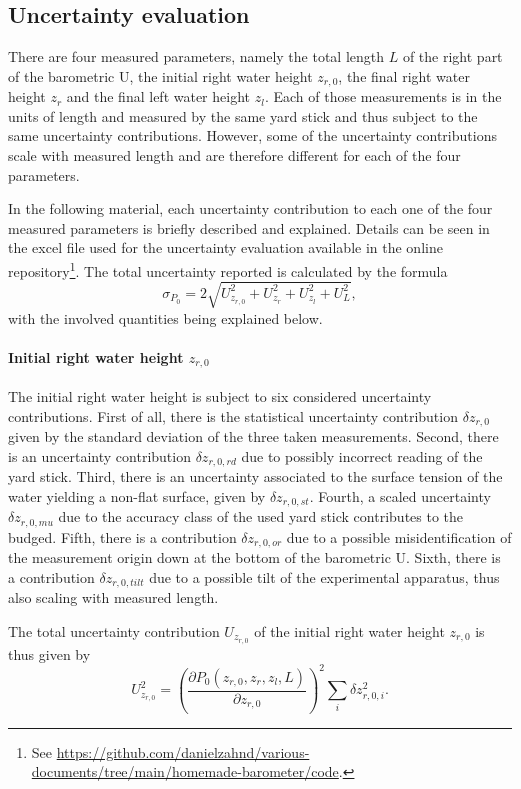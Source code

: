 \documentclass[a4paper,11pt, twocolumn]{article}
\begin{document}
\subsection{Uncertainty evaluation}
There are four measured parameters, namely the total length $L$ of the right part of the barometric U, the initial right water height $z_{r,0}$, the final right water height $z_r$ and the final left water height $z_l$. Each of those measurements is in the units of length and measured by the same yard stick and thus subject to the same uncertainty contributions. However, some of the uncertainty contributions scale with measured length and are therefore different for each of the four parameters.

In the following material, each uncertainty contribution to each one of the four measured parameters is briefly described and explained. Details can be seen in the excel file used for the uncertainty evaluation available in the online repository\footnote{See \url{https://github.com/danielzahnd/various-documents/tree/main/homemade-barometer/code}.}. The total uncertainty reported is calculated by the formula \begin{equation}
	\sigma_{P_0} = 2\sqrt{U_{z_{r,0}}^2 + U_{z_r}^2 + U_{z_l}^2 + U_L^2},
\end{equation} with the involved quantities being explained below.

\paragraph{Initial right water height $z_{r,0}$} The initial right water height is subject to six considered uncertainty contributions. First of all, there is the statistical uncertainty contribution $\delta {z_{r,0}}$ given by the standard deviation of the three taken measurements. Second, there is an uncertainty contribution $\delta z_{r,0,rd}$ due to possibly incorrect reading of the yard stick. Third, there is an uncertainty associated to the surface tension of the water yielding a non-flat surface, given by $\delta z_{r,0,st}$. Fourth, a scaled uncertainty $\delta z_{r,0,mu}$ due to the accuracy class of the used yard stick contributes to the budged. Fifth, there is a contribution $\delta z_{r,0,or}$ due to a possible misidentification of the measurement origin down at the bottom of the barometric U. Sixth, there is a contribution $\delta z_{r,0,tilt}$ due to a possible tilt of the experimental apparatus, thus also scaling with measured length. 

The total uncertainty contribution $U_{z_{r,0}}$ of the initial right water height $z_{r,0}$ is thus given by \begin{equation}
	U_{z_{r,0}}^2 = \left(\frac{\partial P_0(z_{r,0}, z_r, z_l, L)}{\partial z_{r,0}}\right)^2\sum_{i}\delta z_{r,0,i}^2.
\end{equation}
\end{document}
